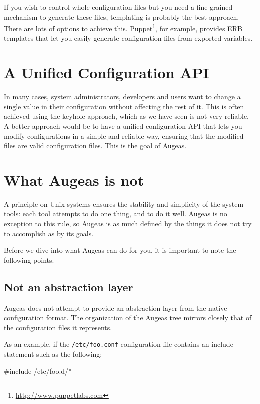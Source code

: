 If you wish to control whole configuration files but you need a fine-grained mechanism to generate these files, templating is probably the best approach. There are lots of options to achieve this. Puppet\footnote{\url{http://www.puppetlabs.com}}, for example, provides ERB templates that let you easily generate configuration files from exported variables.


\section{A Unified Configuration API}

In many cases, system administrators, developers and users want to change a single value in their configuration without affecting the rest of it. This is often achieved using the keyhole approach, which as we have seen is not very reliable. A better approach would be to have a unified configuration API that lets you modify configurations in a simple and reliable way, ensuring that the modified files are valid configuration files. This is the goal of Augeas.

\section{What Augeas is not}

A principle on Unix systems ensures the stability and simplicity of the system tools: each tool attempts to do one thing, and to do it well. Augeas is no exception to this rule, so Augeas is as much defined by the things it does not try to accomplish as by its goals.

Before we dive into what Augeas can do for you, it is important to note the following points.

\subsection{Not an abstraction layer}

Augeas does not attempt to provide an abstraction layer from the native configuration format. The organization of the Augeas tree mirrors closely that of the configuration files it represents.

As an example, if the \nolinkurl{/etc/foo.conf} configuration file contains an include statement such as the following:

\begin{bash}[]
#include /etc/foo.d/*
\end{bash}

